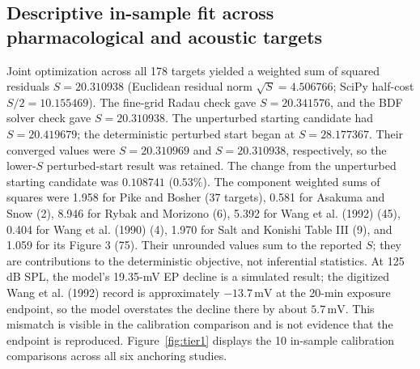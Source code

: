 \documentclass[final,5p,times]{elsarticle}
\begin{document}
\subsection{Descriptive in-sample fit across pharmacological and acoustic targets}\label{sec:calibration-results}

Joint optimization across all 178 targets yielded a weighted sum of squared residuals \(S=20.310938\) (Euclidean residual norm \(\sqrt{S}=4.506766\); SciPy half-cost \(S/2=10.155469\)). The fine-grid Radau check gave \(S=20.341576\), and the BDF solver check gave \(S=20.310938\). The unperturbed starting candidate had \(S=20.419679\); the deterministic perturbed start began at \(S=28.177367\). Their converged values were \(S=20.310969\) and \(S=20.310938\), respectively, so the lower-\(S\) perturbed-start result was retained. The change from the unperturbed starting candidate was \(0.108741\) (\(0.53\%\)). The component weighted sums of squares were 1.958 for Pike and Bosher (37 targets), 0.581 for Asakuma and Snow (2), 8.946 for Rybak and Morizono (6), 5.392 for Wang et al. (1992) (45), 0.404 for Wang et al. (1990) (4), 1.970 for Salt and Konishi Table III (9), and 1.059 for its Figure 3 (75). Their unrounded values sum to the reported \(S\); they are contributions to the deterministic objective, not inferential statistics. At 125 dB SPL, the model's 19.35-mV EP decline is a simulated result; the digitized Wang et al. (1992) record is approximately \(-13.7\,\mathrm{mV}\) at the 20-min exposure endpoint, so the model overstates the decline there by about \(5.7\,\mathrm{mV}\). This mismatch is visible in the calibration comparison and is not evidence that the endpoint is reproduced. Figure~\ref{fig:tier1} displays the 10 in-sample calibration comparisons across all six anchoring studies.
\end{document}
